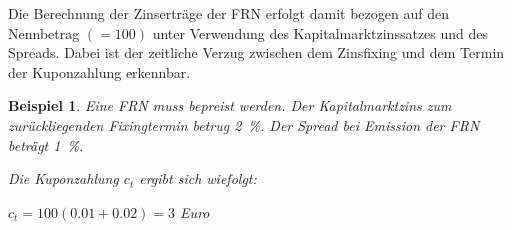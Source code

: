\documentclass[12pt, a4paper]{article}
\theoremstyle{plain}
\newtheorem{example}{Beispiel}
\begin{document}
Die Berechnung der Zinserträge der \gls{FRN} erfolgt damit bezogen auf den Nennbetrag $(= 100)$ unter Verwendung des Kapitalmarktzinssatzes und des Spreads. Dabei ist der zeitliche Verzug zwischen dem Zinsfixing und dem Termin der Kuponzahlung erkennbar.

\begin{example}
	Eine \gls{FRN} muss bepreist werden. Der Kapitalmarktzins zum zurückliegenden Fixingtermin betrug 2~\%. Der \textit{Spread} bei Emission der \gls{FRN} beträgt 1~\%. 
	
	Die Kuponzahlung $c_t$ ergibt sich wiefolgt:

	$c_t= 100 (0.01 + 0.02) = 3 $ Euro
\end{example}
\clearpage
\printbibliography[title={Literatur}]
\end{document}
